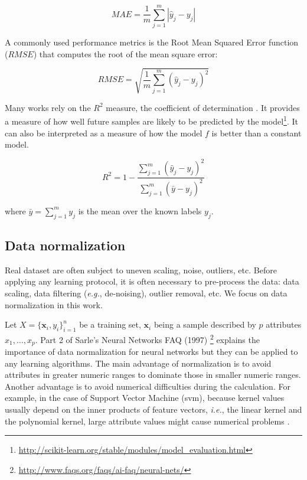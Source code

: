 \begin{equation}
MAE = \frac{1}{m} \sum_{j=1}^m|\hat{y}_j-y_j|
\end{equation}

A commonly used performance metrics is the Root Mean Squared Error function ($RMSE$) that computes the root of the mean square error: 

\begin{equation}
RMSE = \sqrt{\frac{1}{m} \sum_{j=1}^m(\hat{y}_j-y_j)^2}
\end{equation}

Many works rely on the $R^2$ measure, the coefficient of determination \cite{Nagelkerke1991}. It provides a measure of how well future samples are likely to be predicted by the model\footnote{\url{http://scikit-learn.org/stable/modules/model_evaluation.html}}. It can also be interpreted as a measure of how the model $f$ is better than a constant model.

\begin{equation}
R^2 = 1- \frac{\sum_{j=1}^m (\hat{y}_j-y_j)^2}{\sum_{j=1}^m (\bar{y}-y_j)^2}
\end{equation}

\noindent where $\bar{y} = \sum_{j=1}^m y_j$ is the mean over the known labels $y_j$.


\subsection{Data normalization}
\label{sec:data_normalization}
Real dataset are often subject to uneven scaling, noise, outliers, etc. Before applying any learning protocol, it is often necessary to pre-process the data: data scaling, data filtering (\textit{e.g.}, de-noising), outlier removal, etc. We focus on data normalization in this work.

Let $X=\{\textbf{x}_i,y_i\}_{i=1}^n$ be a training set, $\textbf{x}_i$ being a sample described by $p$ attributes $x_1, \ldots, x_p$. Part 2 of Sarle's Neural Networks FAQ (1997) \footnote{\url{http://www.faqs.org/faqs/ai-faq/neural-nets/}} explains the importance of data normalization for neural networks but they can be applied to any learning algorithms. The main advantage of normalization is to avoid attributes in greater numeric ranges to dominate those in smaller numeric ranges. Another advantage is to avoid numerical difficulties during the calculation. For example, in the case of Support Vector Machine ({\sc svm}), because kernel values usually depend on the inner products of feature vectors, \textit{i.e.}, the linear kernel and the polynomial kernel, large attribute values might cause numerical problems \cite{Hsu2008}. 

